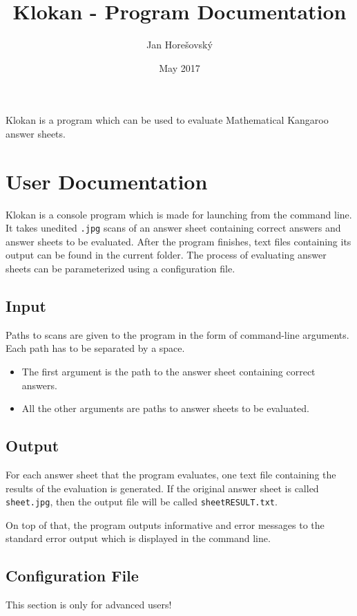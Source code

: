 \documentclass{article}
\begin{document}
\title{Klokan - Program Documentation}
\author{Jan Horešovský}
\date{May 2017}
\maketitle

Klokan is a program which can be used to evaluate Mathematical Kangaroo answer sheets.

\section{User Documentation}{
Klokan is a console program which is made for launching from the command line. It takes unedited \verb+.jpg+ scans of an answer sheet containing correct answers and answer sheets to be evaluated. After the program finishes, text files containing its output can be found in the current folder. The process of evaluating answer sheets can be parameterized using a configuration file.
	
	\subsection{Input}{
	Paths to scans are given to the program in the form of command-line arguments. Each path has to be separated by a space.
	\begin{itemize}
		\item The first argument is the path to the answer sheet containing correct answers.
		\item All the other arguments are paths to answer sheets to be evaluated.
	\end{itemize}
	}

	\subsection{Output}{
	For each answer sheet that the program evaluates, one text file containing the results of the evaluation is generated. If the original answer sheet is called \verb+sheet.jpg+, then the output file will be called \verb+sheetRESULT.txt+.

	On top of that, the program outputs informative and error messages to the standard error output which is displayed in the command line.

	\subsection{Configuration File}
	This section is only for advanced users!

}}
\end{document}
